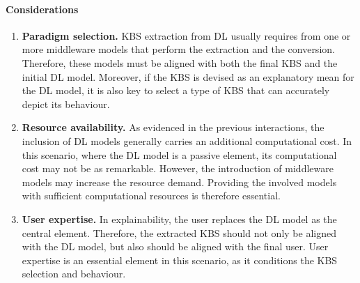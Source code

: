 \paragraph{Considerations}
\begin{enumerate} [start=1,label={\bfseries C\arabic*.}]
    \item \textbf{Paradigm selection.} \label{kbsextradl_C_paradigm} KBS extraction from DL usually requires from one or more middleware models that perform the extraction and the conversion. Therefore, these models must be aligned with both the final KBS and the initial DL model. Moreover, if the KBS is devised as an explanatory mean for the DL model, it is also key to select a type of KBS that can accurately depict its behaviour.
    
    \item \textbf{Resource availability.} \label{kbsextradl_C_resource} As evidenced in the previous interactions, the inclusion of DL models generally carries an additional computational cost. In this scenario, where the DL model is a passive element, its computational cost may not be as remarkable. However, the introduction of middleware models may increase the resource demand. Providing the involved models with sufficient computational resources is therefore essential.
    
    \item \textbf{User expertise.} \label{kbsextradl_C_user} In explainability, the user replaces the DL model as the central element. Therefore, the extracted KBS should not only be aligned with the DL model, but also should be aligned with the final user. User expertise is an essential element in this scenario, as it conditions the KBS selection and behaviour.
\end{enumerate}


